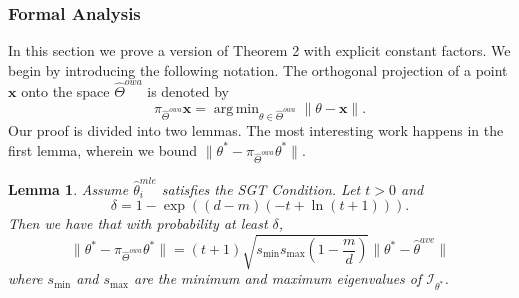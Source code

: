 \documentclass[twoside]{article}
\newtheorem{lemma}{Lemma}
\DeclareMathOperator*{\argmin}{arg\,min}
\newcommand{\smin}{s_\text{min}}
\newcommand{\smax}{s_\text{max}}
\newcommand{\W}{{\hat \Theta^{\textit{owa}}}}
\newcommand{\x}{\mathbf{x}}
\newcommand{\w}{\theta}
\newcommand{\wave}{\hat\w^{ave}}
\newcommand{\wmle}{\hat\w^{mle}}
\newcommand{\wstar}{{\w^{*}}}
\newcommand{\I}{\mathcal I}
\newcommand{\ltwo}[1]{{\lVert {#1} \rVert}}
\newcommand{\proj}[1]{\pi_{{#1}}}
\begin{document}
\subsubsection{Formal Analysis}

In this section we prove a version of Theorem 2 with explicit constant factors.
We begin by introducing the following notation.
The orthogonal projection of a point $\x$ onto the space $\W$ is denoted by
\begin{equation}
\proj{\W}\x = \argmin_{\w\in\W} \ltwo{\w-\x}
.
\end{equation}
Our proof is divided into two lemmas.
The most interesting work happens in the first lemma,
wherein we bound $\ltwo{\wstar-\proj\W\wstar}$.

\begin{lemma}
\label{lem:proj}
Assume $\wmle_i$ satisfies the SGT Condition.
Let $t>0$ and
\begin{equation}
\delta = 1-\exp((d-m)(-t+\ln(t+1)))
.
\label{eq:delta}
\end{equation}
Then we have that with probability at least $\delta$,
\begin{equation}
\ltwo{\wstar-\proj\W\wstar}
=
(t+1)\sqrt{\smin\smax\left(1-\frac{m}{d}\right)}\ltwo{\wstar - \wave}
\end{equation}
where $\smin$ and $\smax$ are the minimum and maximum eigenvalues of $\I_\wstar$.
\end{lemma}
\end{document}
